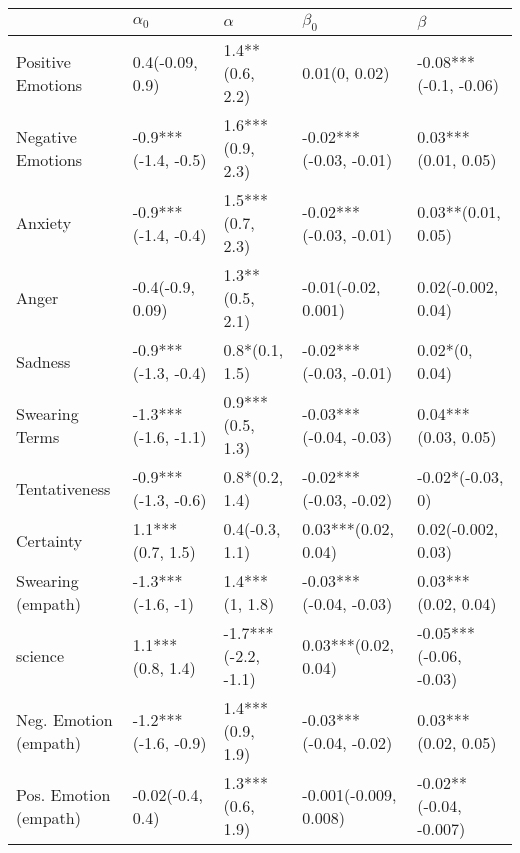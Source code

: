 \begin{tabular}{lllll}
\toprule
{} &           $\alpha_0$ &             $\alpha$ &               $\beta_0$ &                 $\beta$ \\
\midrule
Positive Emotions     &      0.4(-0.09, 0.9) &      1.4**(0.6, 2.2) &           0.01(0, 0.02) &   -0.08***(-0.1, -0.06) \\
Negative Emotions     &  -0.9***(-1.4, -0.5) &     1.6***(0.9, 2.3) &  -0.02***(-0.03, -0.01) &     0.03***(0.01, 0.05) \\
Anxiety               &  -0.9***(-1.4, -0.4) &     1.5***(0.7, 2.3) &  -0.02***(-0.03, -0.01) &      0.03**(0.01, 0.05) \\
Anger                 &     -0.4(-0.9, 0.09) &      1.3**(0.5, 2.1) &     -0.01(-0.02, 0.001) &      0.02(-0.002, 0.04) \\
Sadness               &  -0.9***(-1.3, -0.4) &       0.8*(0.1, 1.5) &  -0.02***(-0.03, -0.01) &          0.02*(0, 0.04) \\
Swearing Terms        &  -1.3***(-1.6, -1.1) &     0.9***(0.5, 1.3) &  -0.03***(-0.04, -0.03) &     0.04***(0.03, 0.05) \\
Tentativeness         &  -0.9***(-1.3, -0.6) &       0.8*(0.2, 1.4) &  -0.02***(-0.03, -0.02) &        -0.02*(-0.03, 0) \\
Certainty             &     1.1***(0.7, 1.5) &       0.4(-0.3, 1.1) &     0.03***(0.02, 0.04) &      0.02(-0.002, 0.03) \\
Swearing (empath)     &    -1.3***(-1.6, -1) &       1.4***(1, 1.8) &  -0.03***(-0.04, -0.03) &     0.03***(0.02, 0.04) \\
science               &     1.1***(0.8, 1.4) &  -1.7***(-2.2, -1.1) &     0.03***(0.02, 0.04) &  -0.05***(-0.06, -0.03) \\
Neg. Emotion (empath) &  -1.2***(-1.6, -0.9) &     1.4***(0.9, 1.9) &  -0.03***(-0.04, -0.02) &     0.03***(0.02, 0.05) \\
Pos. Emotion (empath) &     -0.02(-0.4, 0.4) &     1.3***(0.6, 1.9) &   -0.001(-0.009, 0.008) &  -0.02**(-0.04, -0.007) \\
\bottomrule
\end{tabular}
